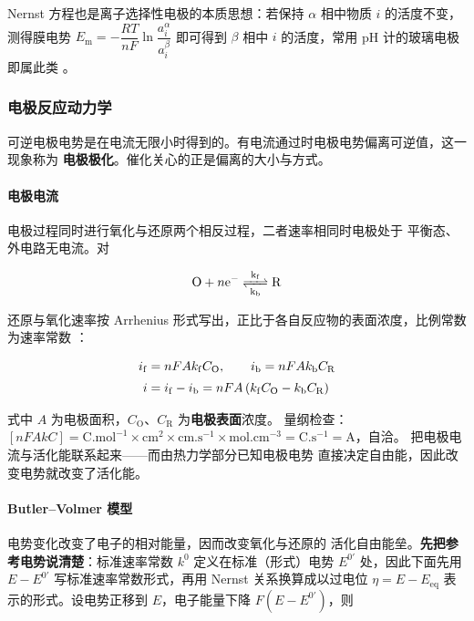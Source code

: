 Nernst 方程也是离子选择性电极的本质思想：若保持 $\alpha$ 相中物质 $i$ 的活度不变，
测得膜电势 $E_{\mathrm{m}}=-\dfrac{RT}{nF}\ln\dfrac{a_i^\alpha}{a_i^\beta}$ 即可得到
$\beta$ 相中 $i$ 的活度，常用 pH 计的玻璃电极即属此类
。

\subsubsection{电极反应动力学}
\label{sec:ch11-kinetics}

可逆电极电势是在电流无限小时得到的。有电流通过时电极电势偏离可逆值，这一现象称为
\textbf{电极极化}。催化关心的正是偏离的大小与方式。

\paragraph{电极电流} 电极过程同时进行氧化与还原两个相反过程，二者速率相同时电极处于
平衡态、外电路无电流。对

\begin{equation}
\ce{O + $n$e- <=>[k_{\mathrm{f}}][k_{\mathrm{b}}] R}
\label{eq:redox}
\end{equation}

还原与氧化速率按 Arrhenius 形式写出，正比于各自反应物的表面浓度，比例常数为速率常数
：

\begin{align}
i_{\mathrm{f}}&=nFAk_{\mathrm{f}}C_{\mathrm{O}},\qquad
i_{\mathrm{b}}=nFAk_{\mathrm{b}}C_{\mathrm{R}}\notag\\[2pt]
i&=i_{\mathrm{f}}-i_{\mathrm{b}}
=nFA\left(k_{\mathrm{f}}C_{\mathrm{O}}-k_{\mathrm{b}}C_{\mathrm{R}}\right)
\label{eq:current-basic}
\end{align}

式中 $A$ 为电极面积，$C_{\mathrm{O}}$、$C_{\mathrm{R}}$ 为\textbf{电极表面}浓度。
量纲检查：$[nFAkC]=\mathrm{C.mol^{-1}}\times\mathrm{cm^2}\times\mathrm{cm.s^{-1}}
\times\mathrm{mol.cm^{-3}}=\mathrm{C.s^{-1}}=\mathrm{A}$，自洽。
 把电极电流与活化能联系起来——而由热力学部分已知电极电势
直接决定自由能，因此改变电势就改变了活化能。

\paragraph{Butler--Volmer 模型} 电势变化改变了电子的相对能量，因而改变氧化与还原的
活化自由能垒。\textbf{先把参考电势说清楚}：标准速率常数 $k^0$ 定义在标准（形式）电势
$E^{0'}$ 处，因此下面先用 $E-E^{0'}$ 写标准速率常数形式，再用 Nernst 关系换算成以过电位
$\eta=E-E_{\mathrm{eq}}$ 表示的形式。设电势正移到 $E$，电子能量下降
$F(E-E^{0'})$，则

